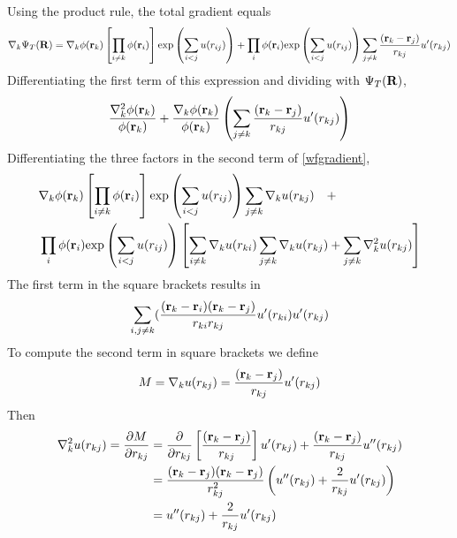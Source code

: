 \documentclass[english, a4paper]{article}
\begin{document}
Using the product rule, the total gradient equals
\begin{equation}
 \nabla_k \Psi_T({\bf R}) = \nabla_k\phi({\bf r}_k) \left[\prod_{i\neq k}\phi({\bf r}_i) \right] \textrm{exp}
                           \left( \sum_{i<j}u(r_{ij}) \right) + \prod_i\phi({\bf r}_i)
                           \textrm{exp} \left( \sum_{i<j}u(r_{ij}) \right)  
                           \sum_{j\neq k}\frac{({\bf r}_k - {\bf r}_j)}{r_{kj}} u^\prime(r_{kj})
 \label{wfgradient}
\end{equation}
Differentiating the first term of this expression and dividing with $\Psi_T({\bf R})$,
\begin{equation}
  \frac{\nabla^2_k\phi({\bf r}_k)}{\phi({\bf r}_k)} + 
  \frac{\nabla_k\phi({\bf r}_k)}{\phi({\bf r}_k)} 
  \left( \sum_{j\neq k}\frac{({\bf r}_k - {\bf r}_j)}{r_{kj}} u^\prime(r_{kj}) \right)
\end{equation}
Differentiating the three factors in the second term of \eqref{wfgradient},
\begin{align}
 &\nabla_k\phi({\bf r}_k) \left[\prod_{i\neq k}\phi({\bf r}_i) \right]
 \textrm{exp} \left( \sum_{i<j}u(r_{ij}) \right)  
 \sum_{j\neq k}\nabla_k u(r_{kj}) \quad + \\ 
 &\prod_i\phi({\bf r}_i)\textrm{exp}  \left( \sum_{i<j}u(r_{ij}) \right) \left[
 \sum_{i\neq k}\nabla_k u(r_{ki}) \sum_{j\neq k}\nabla_k u(r_{kj}) + \sum_{j\neq k}\nabla^2_k u(r_{kj}) \right]
\end{align}
The first term in the square brackets results in
\begin{equation}
 \sum_{i,j\neq k} (\frac{({\bf r}_k - {\bf r}_i)({\bf r}_k - {\bf r}_j)}{r_{ki}r_{kj}} u^\prime(r_{ki})u^\prime(r_{kj})
\end{equation}
To compute the second term in square brackets we define
\begin{equation}
 M = \nabla_k u(r_{kj}) = \frac{({\bf r}_k - {\bf r}_j)}{r_{kj}} u^\prime(r_{kj})
\end{equation}
Then
\begin{align}
 \nabla_k^2 u(r_{kj}) = \frac{\partial M}{\partial r_{kj}} 
 &= \frac{\partial}{\partial r_{kj}}\left[\frac{({\bf r}_k - {\bf r}_j)}{r_{kj}}\right]u^\prime(r_{kj}) + 
 \frac{({\bf r}_k - {\bf r}_j)}{r_{kj}}u^{\prime\prime}(r_{kj}) \\
 &= \frac{({\bf r}_k - {\bf r}_j)({\bf r}_k - {\bf r}_j)}{r_{kj}^2} \left(u^{\prime\prime}(r_{kj}) + 
 \frac{2}{r_{kj}} u^\prime(r_{kj})\right) \\
 &= u^{\prime\prime}(r_{kj}) + \frac{2}{r_{kj}} u^\prime(r_{kj}) \\
\end{align}
\end{document}

